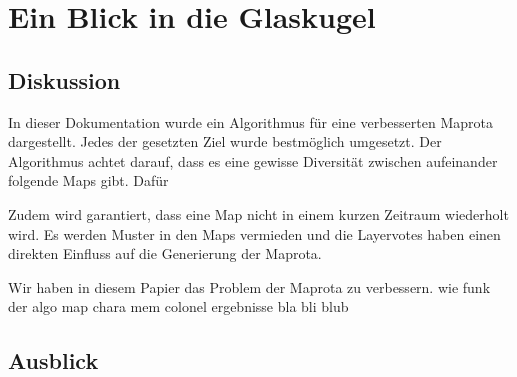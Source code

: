 \section{Ein Blick in die Glaskugel}
    \subsection{Diskussion}
        
    	In dieser Dokumentation wurde ein Algorithmus für eine verbesserten Maprota dargestellt.
        Jedes der gesetzten Ziel wurde bestmöglich umgesetzt. 
        Der Algorithmus achtet darauf, dass es eine gewisse Diversität zwischen aufeinander folgende Maps gibt.
        Dafür  



        Zudem wird garantiert, dass eine Map nicht in einem kurzen Zeitraum wiederholt wird. Es werden Muster in den 
        Maps vermieden und die Layervotes haben einen direkten Einfluss auf die Generierung der Maprota.


        Wir haben in diesem Papier das Problem der Maprota zu verbessern. 
        wie funk der algo
        map chara
        mem colonel 
        ergebnisse
        bla bli blub


    \subsection{Ausblick}
